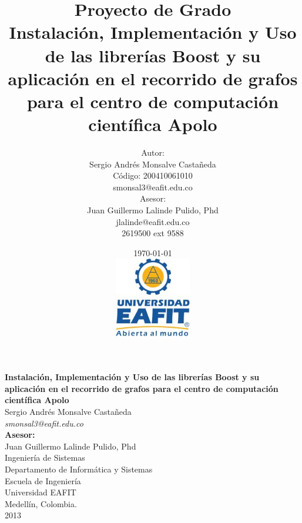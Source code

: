 \documentclass[twoside,letterpaper,12pt]{report}
\title{
	Proyecto de Grado\\[0.5cm]
	Instalación, Implementación y Uso de las librerías Boost y su aplicación en el recorrido de grafos para el centro de computación científica Apolo
}
\author{
	Autor:\\[0.3cm]
	Sergio Andrés Monsalve Castañeda\\
	Código: 200410061010\\
	smonsal3@eafit.edu.co\\[0.7cm]
	Asesor: \\[0.3cm]
	Juan Guillermo Lalinde Pulido, Phd\\
	jlalinde@eafit.edu.co\\
	2619500 ext 9588%
}
\date{
	\today \\[0.5cm]
	\includegraphics[width=0.25\textwidth]{aux/logo_eafit} 
}
\begin{document}

\maketitle


\thispagestyle{empty} %
\begin{center}
\textbf{{\Large Instalación, Implementación y Uso de las librerías Boost y su aplicación en el recorrido de grafos para el centro de computación científica Apolo}}\\[5cm]
{\Large Sergio Andrés Monsalve Castañeda} \\ {\large \textit{smonsal3@eafit.edu.co}}\\[5cm]

{\large \textbf{Asesor:} \\Juan Guillermo Lalinde Pulido, Phd}\\[5cm]

Ingeniería de Sistemas \\ Departamento de Informática y Sistemas  \\ Escuela de Ingeniería \\ Universidad EAFIT \\ Medellín, Colombia.\\
2013

\end{center}
\pagebreak

\end{document}
